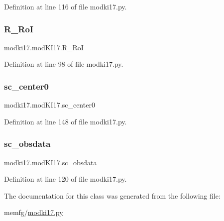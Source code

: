 Definition at line 116 of file modki17.\+py.

\mbox{\label{classmodki17_1_1modKI17_a96feddcfb195555d34758835b7f00e1a}} 
\subsubsection{\texorpdfstring{R\+\_\+\+RoI}{R\_RoI}}
{\footnotesize\ttfamily modki17.\+mod\+K\+I17.\+R\+\_\+\+RoI}



Definition at line 98 of file modki17.\+py.

\mbox{\label{classmodki17_1_1modKI17_a6324ea4fafc077df02e9f29448b4510d}} 
\subsubsection{\texorpdfstring{sc\+\_\+center0}{sc\_center0}}
{\footnotesize\ttfamily modki17.\+mod\+K\+I17.\+sc\+\_\+center0}



Definition at line 148 of file modki17.\+py.

\mbox{\label{classmodki17_1_1modKI17_aa08fa3ee418f2bd940af163631572e8b}} 
\subsubsection{\texorpdfstring{sc\+\_\+obsdata}{sc\_obsdata}}
{\footnotesize\ttfamily modki17.\+mod\+K\+I17.\+sc\+\_\+obsdata}



Definition at line 120 of file modki17.\+py.



The documentation for this class was generated from the following file\+:\begin{DoxyCompactItemize}
\item 
memfg/\hyperlink{modki17_8py}{modki17.\+py}\end{DoxyCompactItemize}
